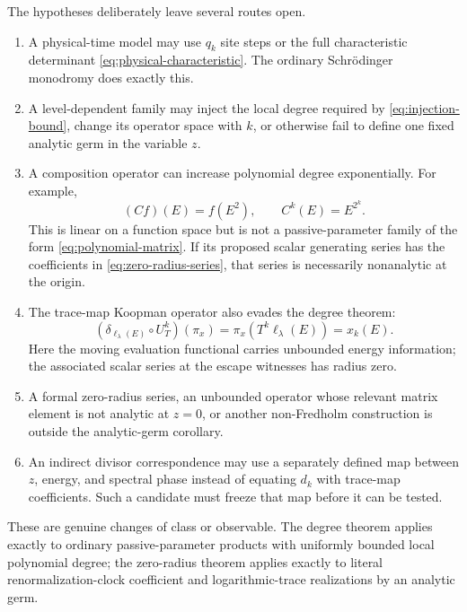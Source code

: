 The hypotheses deliberately leave several routes open.

\begin{enumerate}
\item A physical-time model may use \(q_k\) site steps or the full
characteristic determinant \eqref{eq:physical-characteristic}.  The ordinary
Schr{\"o}dinger monodromy does exactly this.

\item A level-dependent family may inject the local degree required by
\eqref{eq:injection-bound}, change its operator space with \(k\), or otherwise
fail to define one fixed analytic germ in the variable \(z\).

\item A composition operator can increase polynomial degree exponentially.
For example,
\[
(Cf)(E)=f(E^2),\qquad C^k(E)=E^{2^k}.
\]
This is linear on a function space but is not a passive-parameter family of the form
\eqref{eq:polynomial-matrix}.  If its proposed scalar generating series has
the coefficients in \eqref{eq:zero-radius-series}, that series is necessarily
nonanalytic at the origin.

\item The trace-map Koopman operator also evades the degree theorem:
\[
(\delta_{\ell_\lambda(E)}\circ U_T^k)(\pi_x)
=\pi_x(T^k\ell_\lambda(E))=x_k(E).
\]
Here the moving evaluation functional carries unbounded energy information;
the associated scalar series at the escape witnesses has radius zero.

\item A formal zero-radius series, an unbounded operator whose relevant
matrix element is not analytic at \(z=0\), or another non-Fredholm
construction is outside the analytic-germ corollary.

\item An indirect divisor correspondence may use a separately defined map
between \(z\), energy, and spectral phase instead of equating \(d_k\) with
trace-map coefficients.  Such a candidate must freeze that map before it can
be tested.
\end{enumerate}

These are genuine changes of class or observable.  The degree theorem applies
exactly to ordinary passive-parameter products with uniformly bounded local
polynomial degree; the zero-radius theorem applies exactly to literal
renormalization-clock coefficient and logarithmic-trace realizations by an
analytic germ.
